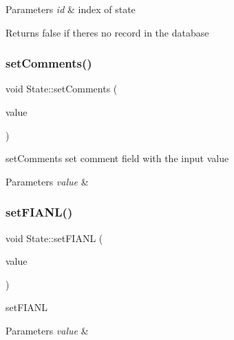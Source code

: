 \begin{DoxyParams}{Parameters}
{\em id} & index of state \\
\hline
\end{DoxyParams}
\begin{DoxyReturn}{Returns}
false if there\textquotesingle{}s no record in the database 
\end{DoxyReturn}
\mbox{\label{class_state_ac23a5b33d51e2e2798ab5ec94f54d379}} 
\subsubsection{\texorpdfstring{setComments()}{setComments()}}
{\footnotesize\ttfamily void State\+::set\+Comments (\begin{DoxyParamCaption}\item[{const Q\+String \&}]{value }\end{DoxyParamCaption})}



set\+Comments set comment field with the input value 


\begin{DoxyParams}{Parameters}
{\em value} & \\
\hline
\end{DoxyParams}
\mbox{\label{class_state_a335a98030204aa203a3bbe69cf3d8ed6}} 
\subsubsection{\texorpdfstring{setFIANL()}{setFIANL()}}
{\footnotesize\ttfamily void State\+::set\+F\+I\+A\+NL (\begin{DoxyParamCaption}\item[{const Q\+String \&}]{value }\end{DoxyParamCaption})}



set\+F\+I\+A\+NL 


\begin{DoxyParams}{Parameters}
{\em value} & \\
\hline
\end{DoxyParams}
\mbox{\label{class_state_a47652011d60fd6cc7ff03f8623b37773}} 
